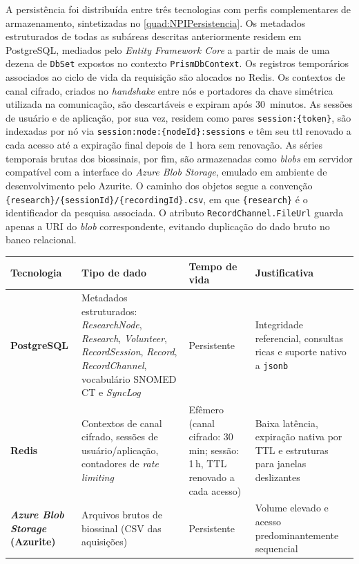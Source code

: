 A persistência foi distribuída entre três tecnologias com perfis complementares de armazenamento, sintetizadas no \autoref{quad:NPIPersistencia}. Os metadados estruturados de todas as subáreas descritas anteriormente residem em PostgreSQL, mediados pelo \textit{Entity Framework Core} a partir de mais de uma dezena de \texttt{DbSet} expostos no contexto \texttt{PrismDbContext}. Os registros temporários associados ao ciclo de vida da requisição são alocados no Redis. Os contextos de canal cifrado, criados no \textit{handshake} entre nós e portadores da chave simétrica utilizada na comunicação, são descartáveis e expiram após 30~minutos. As sessões de usuário e de aplicação, por sua vez, residem como pares \texttt{session:\{token\}}, são indexadas por nó via \texttt{session:node:\{nodeId\}:sessions} e têm seu \gls{ttl} renovado a cada acesso até a expiração final depois de 1 hora sem renovação. As séries temporais brutas dos biossinais, por fim, são armazenadas como \textit{blobs} em servidor compatível com a interface do \textit{Azure Blob Storage}, emulado em ambiente de desenvolvimento pelo Azurite. O caminho dos objetos segue a convenção \texttt{\{research\}/\{sessionId\}/\{recordingId\}.csv}, em que \texttt{\{research\}} é o identificador da pesquisa associada. O atributo \texttt{RecordChannel.FileUrl} guarda apenas a URI do \textit{blob} correspondente, evitando duplicação do dado bruto no banco relacional.

\begin{tabframed}[htpb]
\caption{Distribuição da persistência do NPI entre tecnologias}
\label{quad:NPIPersistencia}
\begin{tabular}{|p{}|p{}|p{}|p{}|}
\hline
\textbf{Tecnologia} & \textbf{Tipo de dado} & \textbf{Tempo de vida} & \textbf{Justificativa} \\ \hline
\textbf{PostgreSQL} & Metadados estruturados: \textit{ResearchNode}, \textit{Research}, \textit{Volunteer}, \textit{RecordSession}, \textit{Record}, \textit{RecordChannel}, vocabulário SNOMED CT e \textit{SyncLog} & Persistente & Integridade referencial, consultas ricas e suporte nativo a \texttt{jsonb} \\ \hline
\textbf{Redis} & Contextos de canal cifrado, sessões de usuário/aplicação, contadores de \textit{rate limiting} & Efêmero (canal cifrado: 30\,min; sessão: 1\,h, TTL renovado a cada acesso) & Baixa latência, expiração nativa por TTL e estruturas para janelas deslizantes \\ \hline
\textbf{\textit{Azure Blob Storage} (Azurite)} & Arquivos brutos de biossinal (CSV das aquisições) & Persistente & Volume elevado e acesso predominantemente sequencial \\ \hline
\end{tabular}
\fonte{}
\end{tabframed}

